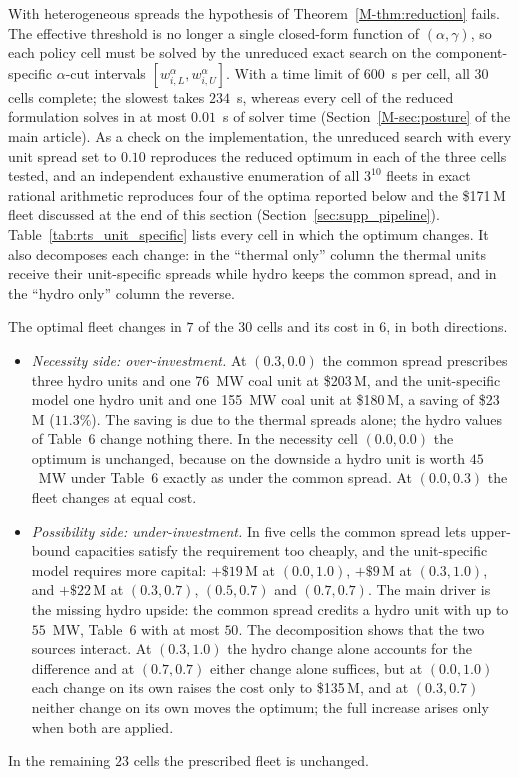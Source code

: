 \documentclass[11pt]{article}
\begin{document}
With heterogeneous spreads the hypothesis of Theorem~\ref*{M-thm:reduction} fails. The effective threshold is no longer a single closed-form function of $(\alpha,\gamma)$, so each policy cell must be solved by the unreduced exact search on the component-specific $\alpha$-cut intervals $[w_{i,L}^\alpha, w_{i,U}^\alpha]$. With a time limit of $600$~s per cell, all $30$ cells complete; the slowest takes $234$~s, whereas every cell of the reduced formulation solves in at most $0.01$~s of solver time (Section~\ref*{M-sec:posture} of the main article). As a check on the implementation, the unreduced search with every unit spread set to $0.10$ reproduces the reduced optimum in each of the three cells tested, and an independent exhaustive enumeration of all $3^{10}$ fleets in exact rational arithmetic reproduces four of the optima reported below and the \$171\,M fleet discussed at the end of this section (Section~\ref{sec:supp_pipeline}). Table~\ref{tab:rts_unit_specific} lists every cell in which the optimum changes. It also decomposes each change: in the ``thermal only'' column the thermal units receive their unit-specific spreads while hydro keeps the common spread, and in the ``hydro only'' column the reverse.



The optimal fleet changes in $7$ of the $30$ cells and its cost in $6$, in both directions.
\begin{itemize}
\item \emph{Necessity side: over-investment.} At $(0.3, 0.0)$ the common spread prescribes three hydro units and one 76~MW coal unit at \$203\,M, and the unit-specific model one hydro unit and one 155~MW coal unit at \$180\,M, a saving of \$23\,M ($11.3\%$). The saving is due to the thermal spreads alone; the hydro values of Table~6 change nothing there. In the necessity cell $(0.0, 0.0)$ the optimum is unchanged, because on the downside a hydro unit is worth $45$~MW under Table~6 exactly as under the common spread. At $(0.0, 0.3)$ the fleet changes at equal cost.
\item \emph{Possibility side: under-investment.} In five cells the common spread lets upper-bound capacities satisfy the requirement too cheaply, and the unit-specific model requires more capital: $+\$19$\,M at $(0.0, 1.0)$, $+\$9$\,M at $(0.3, 1.0)$, and $+\$22$\,M at $(0.3, 0.7)$, $(0.5, 0.7)$ and $(0.7, 0.7)$. The main driver is the missing hydro upside: the common spread credits a hydro unit with up to $55$~MW, Table~6 with at most $50$. The decomposition shows that the two sources interact. At $(0.3, 1.0)$ the hydro change alone accounts for the difference and at $(0.7, 0.7)$ either change alone suffices, but at $(0.0, 1.0)$ each change on its own raises the cost only to \$135\,M, and at $(0.3, 0.7)$ neither change on its own moves the optimum; the full increase arises only when both are applied.
\end{itemize}
In the remaining $23$ cells the prescribed fleet is unchanged.
\end{document}
